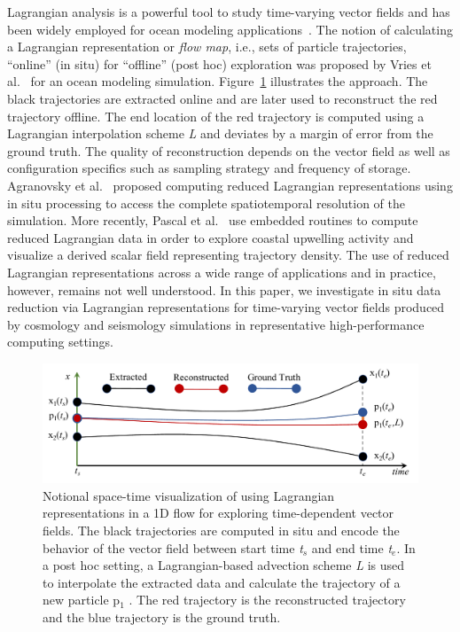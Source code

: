 %
Lagrangian analysis is a powerful tool to study time-varying vector fields and has been widely employed for ocean modeling applications~\cite{VANSEBILLE201849}.
%
The notion of calculating a Lagrangian representation or \textit{flow map}, i.e., sets of particle trajectories, ``online'' (in situ) for ``offline'' (post hoc) exploration was proposed by Vries et al.~\cite{vries2001calculating} for an ocean modeling simulation.
%
Figure~\ref{fig:sample} illustrates the approach.
%
The black trajectories are extracted online and are later used to reconstruct the red trajectory offline.
%
The end location of the red trajectory is computed using a Lagrangian interpolation scheme \textit{L} and deviates by a margin of error from the ground truth.
%
The quality of reconstruction depends on the vector field as well as configuration specifics such as sampling strategy and frequency of storage. 
%
Agranovsky et al.~\cite{agranovsky2014improved} proposed computing reduced Lagrangian representations using in situ processing to access the complete spatiotemporal resolution of the simulation.
%
More recently, Pascal et al.~\cite{envirvis.20171099,siegfried2019tropical} use embedded routines to compute reduced Lagrangian data in order to explore coastal upwelling activity and visualize a derived scalar field representing trajectory density.
%
The use of reduced Lagrangian representations across a wide range of applications and in practice, however, remains not well understood.
%
In this paper, we investigate in situ data reduction via Lagrangian representations for time-varying vector fields produced by cosmology and seismology simulations in representative high-performance computing settings.
%

\begin{figure}[!t]
\centering
\includegraphics[width=0.9\linewidth]{Images/sample.pdf}
\vspace{-5mm}
\caption{Notional space-time visualization of using Lagrangian representations in a 1D flow for exploring time-dependent vector fields. The black trajectories are computed in situ and encode the behavior of the vector field between start time \textit{t$_{s}$} and end time \textit{t$_{e}$}. In a post hoc setting, a Lagrangian-based advection scheme \textit{L} is used to interpolate the extracted data and calculate the trajectory of a new particle p$_{1}$ . The red trajectory is the reconstructed trajectory and the blue trajectory is the ground truth.}
\vspace{-5mm}
\label{fig:sample}
\end{figure}

